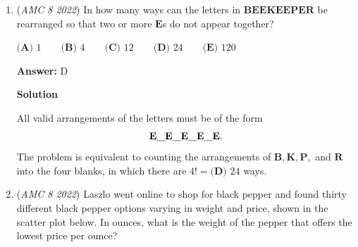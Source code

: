 \begin{enumerate}
\textbf{Solution}

Let $m$ and $n$ be positive integers such that $m>n$ and $m+n=28.$ It follows that $m=2n+d$ for some positive integer $d.$ We wish to find the number of possible values for $d.$

 By substitution, we have $(2n+d)+n=28,$ from which $d=28-3n.$ Note that $n=1,2,3,\ldots,9$ each generate a positive integer for $d,$ so there are $\boxed{\textbf{(D) } 9}$ possible values for $d.$




\textbf{Solution 2}

Let the positive integer be $x$, \_\_\_\_ be $z$ and twice another $2y$. We can form the following equations:

 $x$ + $y$ = $28$
$x$ - $2y$ = $z$

 We use elimination to get this equation:$3y$ = 28 - $z$. The smallest that $z$ can be is $1$ ($28$ - $1$ = $27$ (True)), and the largest $25$ ($28$ - $25$ = $3$ (True)). $25$ - $1$ = 24, and since we only want multiples of $3$ this will occur every 3 numbers. 24 / 3 = 8. We are missing the $1$ which we subtracted earlier, so our final answer will be 9 numbers, or $\boxed{\textbf{(D) } 9}$. 

 


	\item (\textit{AMC 8 2022}) In how many ways can the letters in $\textbf{BEEKEEPER}$ be rearranged so that two or more $\textbf{E}$s do not appear together?


 $\textbf{(A) } 1 \qquad \textbf{(B) } 4 \qquad \textbf{(C) } 12 \qquad \textbf{(D) } 24 \qquad \textbf{(E) } 120$

 \textbf{Answer: }D



\textbf{Solution}

All valid arrangements of the letters must be of the form 
 \[\textbf{E\underline{\hspace{3mm}}E\underline{\hspace{3mm}}E\underline{\hspace{3mm}}E\underline{\hspace{3mm}}E}.\]The problem is equivalent to counting the arrangements of $\textbf{B},\textbf{K},\textbf{P},$ and $\textbf{R}$ into the four blanks, in which there are $4!=\boxed{\textbf{(D) } 24}$ ways.

 


	\item (\textit{AMC 8 2022}) Laszlo went online to shop for black pepper and found thirty different black pepper options varying in weight and price, shown in the scatter plot below. In ounces, what is the weight of the pepper that offers the lowest price per ounce?



\end{enumerate}
